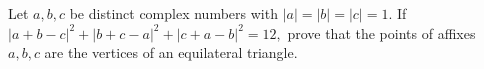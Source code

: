 Let $a,b,c$ be distinct complex numbers with $|a|=|b|=|c|=1.$ If $|a+b-c|^2+|b+c-a|^2+|c+a-b|^2=12,$ prove that the points of affixes $a,b,c$ are the vertices of an equilateral triangle.